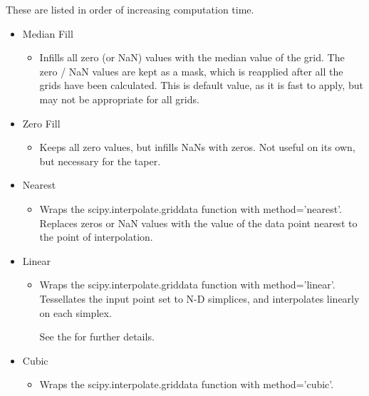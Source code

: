 \documentclass[letterpaper,10pt,english,openany,oneside]{sphinxmanual}
\begin{document}
These are listed in order of increasing computation time.
\begin{itemize}
\item {} 
Median Fill
\begin{itemize}
\item {} 
Infills all zero (or NaN) values with the median value of the grid. The zero / NaN values are kept as a mask, which is reapplied after all the grids have been calculated. This is default value, as it is fast to apply, but may not be appropriate for all grids.

\end{itemize}

\item {} 
Zero Fill
\begin{itemize}
\item {} 
Keeps all zero values, but infills NaNs with zeros. Not useful on its own, but necessary for the {\hyperref[\detokenize{content/preprocessing/tapering:blur}]{}} taper.

\end{itemize}

\end{itemize}
\begin{itemize}
\item {} 
Nearest
\begin{itemize}
\item {} 
Wraps the scipy.interpolate.griddata function with method=’nearest’. Replaces zeros or NaN values with the value of the data point nearest to the point of interpolation.

\end{itemize}

\item {} 
Linear
\begin{itemize}
\item {} 
Wraps the scipy.interpolate.griddata function with method=’linear’. Tessellates the input point set to N-D simplices, and interpolates linearly on each simplex. %
\begin{footnote}[1]\sphinxAtStartFootnote
See the   for further details.
%
\end{footnote}

\end{itemize}

\item {} 
Cubic
\begin{itemize}
\item {} 
Wraps the scipy.interpolate.griddata function with method=’cubic’. \sphinxfootnotemark[1]

\end{itemize}

\end{itemize}
\end{document}
